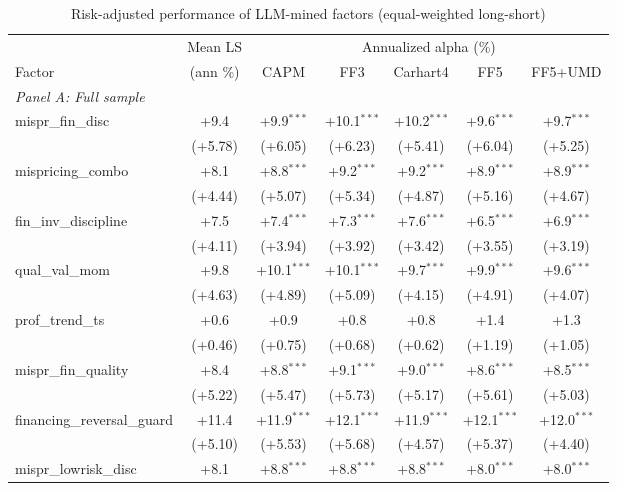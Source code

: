 \begin{table}[htbp]\centering
\caption{Risk-adjusted performance of LLM-mined factors (equal-weighted long-short)}
\label{tab:alphas_ew}
\begin{threeparttable}\footnotesize
\begin{tabular}{lcccccc}
\toprule
 & Mean LS & \multicolumn{5}{c}{Annualized alpha (\%)} \\
\cmidrule(lr){3-7}
Factor & (ann \%) & CAPM & FF3 & Carhart4 & FF5 & FF5+UMD \\
\midrule
\multicolumn{7}{l}{\textit{Panel A: Full sample}} \\
\addlinespace
mispr\_fin\_disc & +9.4 & +9.9$^{***}$ & +10.1$^{***}$ & +10.2$^{***}$ & +9.6$^{***}$ & +9.7$^{***}$ \\
 & (+5.78) & (+6.05) & (+6.23) & (+5.41) & (+6.04) & (+5.25) \\
\addlinespace
mispricing\_combo & +8.1 & +8.8$^{***}$ & +9.2$^{***}$ & +9.2$^{***}$ & +8.9$^{***}$ & +8.9$^{***}$ \\
 & (+4.44) & (+5.07) & (+5.34) & (+4.87) & (+5.16) & (+4.67) \\
\addlinespace
fin\_inv\_discipline & +7.5 & +7.4$^{***}$ & +7.3$^{***}$ & +7.6$^{***}$ & +6.5$^{***}$ & +6.9$^{***}$ \\
 & (+4.11) & (+3.94) & (+3.92) & (+3.42) & (+3.55) & (+3.19) \\
\addlinespace
qual\_val\_mom & +9.8 & +10.1$^{***}$ & +10.1$^{***}$ & +9.7$^{***}$ & +9.9$^{***}$ & +9.6$^{***}$ \\
 & (+4.63) & (+4.89) & (+5.09) & (+4.15) & (+4.91) & (+4.07) \\
\addlinespace
prof\_trend\_ts & +0.6 & +0.9 & +0.8 & +0.8 & +1.4 & +1.3 \\
 & (+0.46) & (+0.75) & (+0.68) & (+0.62) & (+1.19) & (+1.05) \\
\addlinespace
mispr\_fin\_quality & +8.4 & +8.8$^{***}$ & +9.1$^{***}$ & +9.0$^{***}$ & +8.6$^{***}$ & +8.5$^{***}$ \\
 & (+5.22) & (+5.47) & (+5.73) & (+5.17) & (+5.61) & (+5.03) \\
\addlinespace
financing\_reversal\_guard & +11.4 & +11.9$^{***}$ & +12.1$^{***}$ & +11.9$^{***}$ & +12.1$^{***}$ & +12.0$^{***}$ \\
 & (+5.10) & (+5.53) & (+5.68) & (+4.57) & (+5.37) & (+4.40) \\
\addlinespace
mispr\_lowrisk\_disc & +8.1 & +8.8$^{***}$ & +8.8$^{***}$ & +8.8$^{***}$ & +8.0$^{***}$ & +8.0$^{***}$ \\

\end{tabular}
\end{threeparttable}
\end{table}
